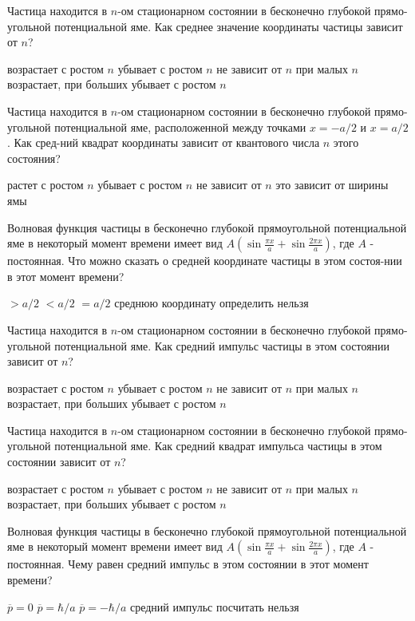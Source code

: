 \documentclass[11pt,a4paper]{exam}
\begin{document}
\begin{questions}
\question Частица находится в $n$-ом стационарном состоянии в бесконечно глубокой прямо-угольной потенциальной яме. Как среднее значение координаты частицы зависит от $n$?
\begin{choices}
\choice возрастает с ростом $n$    
\choice убывает с ростом $n$
\choice не зависит от $n$       
\choice при малых $n$ возрастает, при больших убывает с ростом $n$
\end{choices}

\question Частица находится в $n$-ом стационарном состоянии в бесконечно глубокой прямо-угольной потенциальной яме, расположенной между точками $x =  - a/2$ и $x = a/2$. Как сред-ний квадрат координаты зависит от квантового числа $n$ этого состояния?
\begin{choices}
\choice растет с ростом $n$        
\choice убывает с ростом $n$
\choice не зависит от $n$       
\choice это зависит от ширины ямы
\end{choices}

\question Волновая функция частицы в бесконечно глубокой прямоугольной потенциальной яме в некоторый момент времени имеет вид $A\left( {\sin \frac{{\pi x}}{a} + \sin \frac{{2\pi x}}{a}} \right)$, где $A$ - постоянная. Что можно сказать о средней координате частицы в этом состоя-нии в этот момент времени?
\begin{choices}
\choice $ > a/2$          
\choice $ < a/2$
\choice $ = a/2$          
\choice среднюю координату определить нельзя
\end{choices}

\question Частица находится в $n$-ом стационарном состоянии в бесконечно глубокой прямо-угольной потенциальной яме. Как средний импульс частицы в этом состоянии зависит от $n$?
\begin{choices}
\choice возрастает с ростом $n$    
\choice убывает с ростом $n$
\choice не зависит от $n$       
\choice при малых $n$ возрастает, при больших убывает с ростом $n$
\end{choices}

\question Частица находится в $n$-ом стационарном состоянии в бесконечно глубокой прямо-угольной потенциальной яме. Как средний квадрат импульса частицы в этом состоянии зависит от $n$?
\begin{choices}
\choice возрастает с ростом $n$    
\choice убывает с ростом $n$
\choice не зависит от $n$       
\choice при малых $n$ возрастает, при больших убывает с ростом $n$
\end{choices}

\question Волновая функция частицы в бесконечно глубокой прямоугольной потенциальной яме в некоторый момент времени имеет вид $A\left( {\sin \frac{{\pi x}}{a} + \sin \frac{{2\pi x}}{a}} \right)$, где $A$ - постоянная. Чему равен средний импульс в этом состоянии в этот момент времени?
\begin{choices}
\choice $\overline p  = 0$   
\choice $\overline p  = \hbar /a$  
\choice $\overline p  =  - \hbar /a$  
\choice средний импульс посчитать нельзя
\end{choices}


\end{questions}
\end{document}
